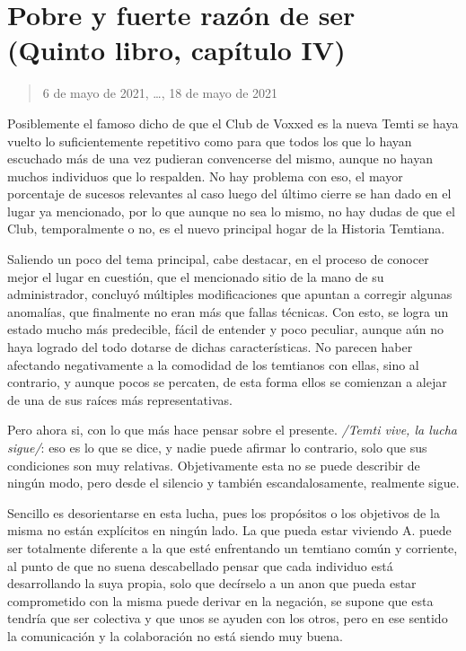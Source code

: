 \documentclass[
]{book}
\begin{document}
\hypertarget{pobre-y-fuerte-razuxf3n-de-ser-quinto-libro-capuxedtulo-iv}{%
\section{Pobre y fuerte razón de ser (Quinto libro, capítulo IV)}\label{pobre-y-fuerte-razuxf3n-de-ser-quinto-libro-capuxedtulo-iv}}

\begin{quote}
6 de mayo de 2021, \ldots, 18 de mayo de 2021
\end{quote}

Posiblemente el famoso dicho de que el Club de Voxxed es la nueva Temti se haya vuelto lo suficientemente repetitivo como para que todos los que lo hayan escuchado más de una vez pudieran convencerse del mismo, aunque no hayan muchos individuos que lo respalden. No hay problema con eso, el mayor porcentaje de sucesos relevantes al caso luego del último cierre se han dado en el lugar ya mencionado, por lo que aunque no sea lo mismo, no hay dudas de que el Club, temporalmente o no, es el nuevo principal hogar de la Historia Temtiana.

Saliendo un poco del tema principal, cabe destacar, en el proceso de conocer mejor el lugar en cuestión, que el mencionado sitio de la mano de su administrador, concluyó múltiples modificaciones que apuntan a corregir algunas anomalías, que finalmente no eran más que fallas técnicas. Con esto, se logra un estado mucho más predecible, fácil de entender y poco peculiar, aunque aún no haya logrado del todo dotarse de dichas características. No parecen haber afectando negativamente a la comodidad de los temtianos con ellas, sino al contrario, y aunque pocos se percaten, de esta forma ellos se comienzan a alejar de una de sus raíces más representativas.

Pero ahora si, con lo que más hace pensar sobre el presente. \emph{/Temti vive, la lucha sigue/}: eso es lo que se dice, y nadie puede afirmar lo contrario, solo que sus condiciones son muy relativas. Objetivamente esta no se puede describir de ningún modo, pero desde el silencio y también escandalosamente, realmente sigue.

Sencillo es desorientarse en esta lucha, pues los propósitos o los objetivos de la misma no están explícitos en ningún lado. La que pueda estar viviendo A. puede ser totalmente diferente a la que esté enfrentando un temtiano común y corriente, al punto de que no suena descabellado pensar que cada individuo está desarrollando la suya propia, solo que decírselo a un anon que pueda estar comprometido con la misma puede derivar en la negación, se supone que esta tendría que ser colectiva y que unos se ayuden con los otros, pero en ese sentido la comunicación y la colaboración no está siendo muy buena.
\end{document}
